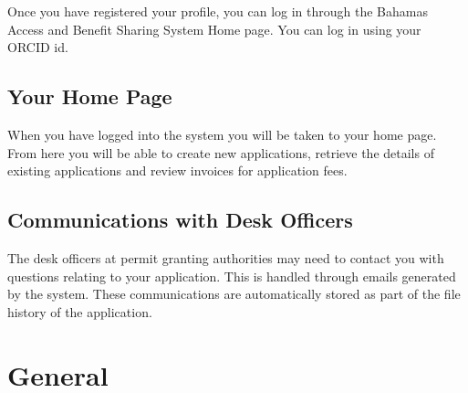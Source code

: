 \documentclass[
]{book}
\begin{document}
Once you have registered your profile, you can log in through the Bahamas Access and Benefit Sharing System Home page. You can log in using your ORCID id.

\hypertarget{your-home-page}{%
\section{Your Home Page}\label{your-home-page}}

When you have logged into the system you will be taken to your home page. From here you will be able to create new applications, retrieve the details of existing applications and review invoices for application fees.

\hypertarget{communications-with-desk-officers}{%
\section{Communications with Desk Officers}\label{communications-with-desk-officers}}

The desk officers at permit granting authorities may need to contact you with questions relating to your application. This is handled through emails generated by the system. These communications are automatically stored as part of the file history of the application.

\hypertarget{general}{%
\chapter{General}\label{general}}
\end{document}
